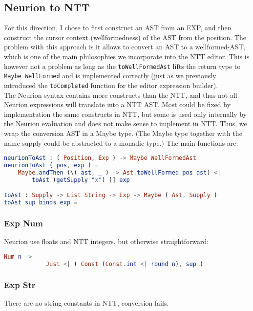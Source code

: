 \documentclass[10pt,a4paper,english]{article}
\begin{document}
\subsection{Neurion to NTT}
For this direction, I chose to first construct an AST from an EXP, and then construct the cursor context (wellformedness) of the AST from the position. The problem with this approach is it allows to convert an AST to a wellformed-AST, which is one of the main philosophies we incorporate into the NTT editor. This is however not a problem as long as the \texttt{toWellFormedAst} lifts the return type to \texttt{Maybe WellFormed} and is implemented correctly (just as we previously introduced the \texttt{toCompleted} function for the editor expression builder).
\\
The Neurion syntax contains more constructs than the NTT, and thus not all Neurion expressions will translate into a NTT AST. Most could be fixed by implementation the same constructs in NTT, but some is used only internally by the Neurion evaluation and does not make sense to implement in NTT. Thus, we wrap the conversion AST in a Maybe type. (The Maybe type together with the name-supply could be abstracted to a monadic type.) The main functions are:
\begin{lstlisting}[language=elm,%
                     label="eval-evaluated",%
                     gobble=0,%
                     ]
neurionToAst : ( Position, Exp ) -> Maybe WellFormedAst
neurionToAst ( pos, exp ) =
    Maybe.andThen (\( ast, _ ) -> Ast.toWellFormed pos ast) <|
        toAst (getSupply "x") [] exp

toAst : Supply -> List String -> Exp -> Maybe ( Ast, Supply )
toAst sup binds exp =
\end{lstlisting}

\subsubsection*{Exp Num}
Neurion use floats and NTT integers, but otherwise straightforward:
\begin{lstlisting}[language=elm,%
                     label="eval-evaluated",%
                     gobble=8,%
                     ]
        Num n ->
            Just <| ( Const (Const.int <| round n), sup )
\end{lstlisting}

\subsubsection*{Exp Str}
There are no string constants in NTT, conversion fails.
\end{document}
